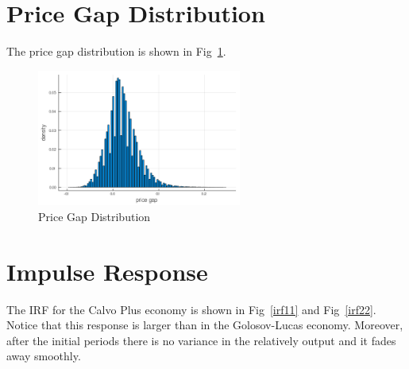 \section{Price Gap Distribution }

The price gap distribution is shown in Fig~\ref{pgcp}.
\begin{figure}[H]
    \centering
    \includegraphics[width = 0.6\textwidth]{../tasks/Calvo_Plus/output/price_gap_dist_cp.png}
    \caption{Price Gap Distribution}
    \label{pgcp}
\end{figure}

\section{Impulse Response}

The IRF for the Calvo Plus economy is shown in Fig~\ref{irf11} and Fig~\ref{irf22}. Notice that this response is larger than in the Golosov-Lucas economy. Moreover, after the initial periods there is no variance in the relatively output and it fades away smoothly.


